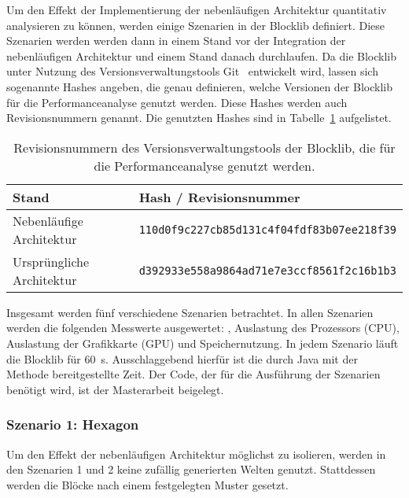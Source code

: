 Um den Effekt der Implementierung der nebenläufigen Architektur quantitativ analysieren zu können, werden einige Szenarien in der Blocklib definiert. Diese Szenarien werden werden dann in einem Stand vor der Integration der nebenläufigen Architektur und einem Stand danach durchlaufen. Da die Blocklib unter Nutzung des Versionsverwaltungstools Git~\cite{Chacon2014} entwickelt wird, lassen sich sogenannte Hashes angeben, die genau definieren, welche Versionen der Blocklib für die Performanceanalyse genutzt werden. Diese Hashes werden auch Revisionsnummern genannt. Die genutzten Hashes sind in Tabelle~\ref{tab:perfHash} aufgelistet.
\begin{table}
	\centering
	\begin{tabular}{ll}
		\toprule
		Stand & Hash / Revisionsnummer \\
		\midrule
		Nebenläufige Architektur & \texttt{110d0f9c227cb85d131c4f04fdf83b07ee218f39}\\
		Ursprüngliche Architektur & \texttt{d392933e558a9864ad71e7e3ccf8561f2c16b1b3} \\
		\bottomrule
	\end{tabular}
	\caption{Revisionsnummern des Versionsverwaltungstools der Blocklib, die für die Performanceanalyse genutzt werden.}\label{tab:perfHash}
\end{table}

Insgesamt werden fünf verschiedene Szenarien betrachtet. In allen Szenarien werden die folgenden Messwerte ausgewertet: \si{\fps}, Auslastung des Prozessors (CPU), Auslastung der Grafikkarte (GPU) und Speichernutzung. In jedem Szenario läuft die Blocklib für \SI{60}{\second}. Ausschlaggebend hierfür ist die durch Java mit der Methode  bereitgestellte Zeit. Der Code, der für die Ausführung der Szenarien benötigt wird, ist der Masterarbeit beigelegt.


\subsubsection{Szenario 1: Hexagon}
Um den Effekt der nebenläufigen Architektur möglichst zu isolieren, werden in den Szenarien 1 und 2 keine zufällig generierten Welten genutzt. Stattdessen werden die Blöcke nach einem festgelegten Muster gesetzt.

